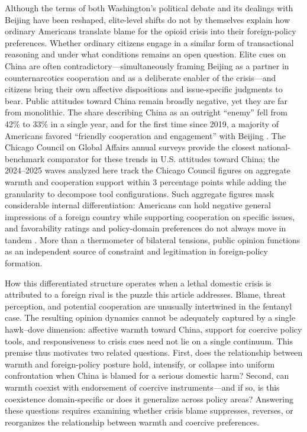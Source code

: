 \documentclass[12pt,letterpaper]{article}
\begin{document}
Although the terms of both Washington's political debate and its dealings with Beijing have been reshaped, elite-level shifts do not by themselves explain how ordinary Americans translate blame for the opioid crisis into their foreign-policy preferences. Whether ordinary citizens engage in a similar form of transactional reasoning and under what conditions remains an open question. Elite cues on China are often contradictory---simultaneously framing Beijing as a partner in counternarcotics cooperation and as a deliberate enabler of the crisis---and citizens bring their own affective dispositions and issue-specific judgments to bear. Public attitudes toward China remain broadly negative, yet they are far from monolithic. The share describing China as an outright ``enemy'' fell from 42\% to 33\% in a single year, and for the first time since 2019, a majority of Americans favored ``friendly cooperation and engagement'' with Beijing \citep{huang_negative_2025, kafura_americans_2025}. The Chicago Council on Global Affairs annual surveys \citep{kafura_americans_2025} provide the closest national-benchmark comparator for these trends in U.S. attitudes toward China; the 2024--2025 waves analyzed here track the Chicago Council figures on aggregate warmth and cooperation support within 3 percentage points while adding the granularity to decompose tool configurations. Such aggregate figures mask considerable internal differentiation: Americans can hold negative general impressions of a foreign country while supporting cooperation on specific issues, and favorability ratings and policy-domain preferences do not always move in tandem \citep{holsti_public_2004, gries_political_2010, jin_americans_2021}. More than a thermometer of bilateral tensions, public opinion functions as an independent source of constraint and legitimation in foreign-policy formation.

How this differentiated structure operates when a lethal domestic crisis is attributed to a foreign rival is the puzzle this article addresses. Blame, threat perception, and potential cooperation are unusually intertwined in the fentanyl case. The resulting opinion dynamics cannot be adequately captured by a single hawk--dove dimension: affective warmth toward China, support for coercive policy tools, and responsiveness to crisis cues need not lie on a single continuum. This premise thus motivates two related questions. First, does the relationship between warmth and foreign-policy posture hold, intensify, or collapse into uniform confrontation when China is blamed for a serious domestic harm? Second, can warmth coexist with endorsement of coercive instruments---and if so, is this coexistence domain-specific or does it generalize across policy areas? Answering these questions requires examining whether crisis blame suppresses, reverses, or reorganizes the relationship between warmth and coercive preferences.
\end{document}
